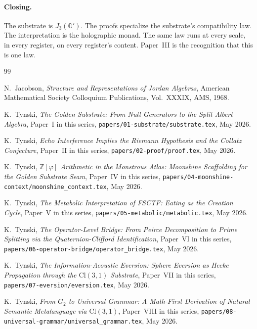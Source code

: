 \documentclass[11pt,a4paper]{article}
\theoremstyle{plain}
\theoremstyle{definition}
\theoremstyle{remark}
\numberwithin{equation}{section}
\providecommand{\Os}{\mathbb{O}'}
\begin{document}
\paragraph{Closing.}  The substrate is $J_3(\Os)$.  The proofs
specialize the substrate's compatibility law.  The
interpretation is the holographic monad.  The same law runs at
every scale, in every register, on every register's content.
Paper~III is the recognition that this is one law.



\begin{thebibliography}{99}

N.~Jacobson,
\emph{Structure and Representations of Jordan Algebras},
American Mathematical Society Colloquium Publications,
Vol.~XXXIX, AMS, 1968.

K.~Tynski,
\emph{The Golden Substrate: From Null Generators to the Split
Albert Algebra}, Paper~I in this series,
\texttt{papers/01-substrate/substrate.tex}, May 2026.

K.~Tynski,
\emph{Echo Interference Implies the Riemann Hypothesis and the
Collatz Conjecture}, Paper~II in this series,
\texttt{papers/02-proof/proof.tex}, May 2026.

K.~Tynski,
\emph{$\mathbb{Z}[\varphi]$ Arithmetic in the Monstrous Atlas:
Moonshine Scaffolding for the Golden Substrate Seam},
Paper~IV in this series,
\texttt{papers/04-moonshine-context/moonshine\_context.tex}, May 2026.

K.~Tynski,
\emph{The Metabolic Interpretation of FSCTF: Eating as the Creation
Cycle}, Paper~V in this series,
\texttt{papers/05-metabolic/metabolic.tex}, May 2026.

K.~Tynski,
\emph{The Operator-Level Bridge: From Peirce Decomposition to Prime
Splitting via the Quaternion-Clifford Identification},
Paper~VI in this series,
\texttt{papers/06-operator-bridge/operator\_bridge.tex}, May 2026.

K.~Tynski,
\emph{The Information-Acoustic Eversion: Sphere Eversion as Hecke
Propagation through the $\mathrm{Cl}(3,1)$ Substrate},
Paper~VII in this series,
\texttt{papers/07-eversion/eversion.tex}, May 2026.

K.~Tynski,
\emph{From $G_2$ to Universal Grammar: A Math-First Derivation of
Natural Semantic Metalanguage via $\mathrm{Cl}(3,1)$},
Paper~VIII in this series,
\texttt{papers/08-universal-grammar/universal\_grammar.tex}, May 2026.


\end{thebibliography}
\end{document}
